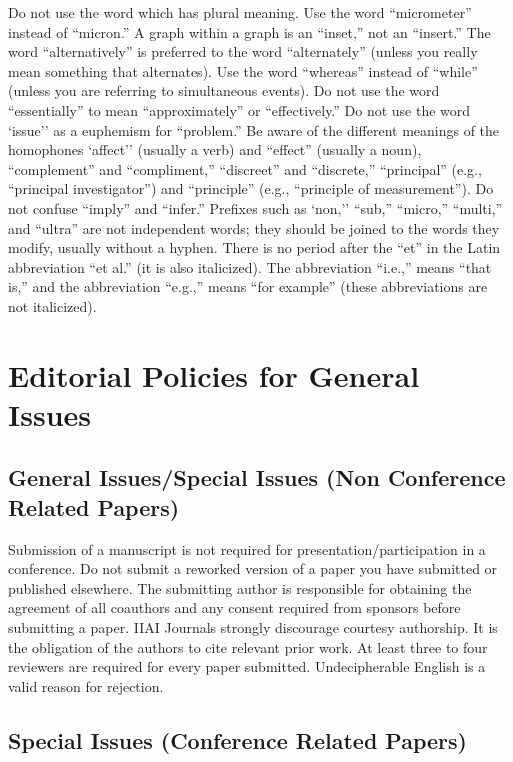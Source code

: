 \documentclass[11pt, onecolumn, twoside, a4paper]{article}
\begin{document}
Do not use the word which has plural meaning. 
Use the word ``micrometer'' instead of ``micron.'' 
A graph within a graph is an ``inset,'' not an ``insert.'' 
The word ``alternatively'' is preferred to the word ``alternately'' (unless you really mean something that alternates). 
Use the word ``whereas'' instead of ``while'' (unless you are referring to simultaneous events). 
Do not use the word ``essentially'' to mean ``approximately'' or ``effectively.'' 
Do not use the word `issue'' as a euphemism for ``problem.'' 
Be aware of the different meanings of the homophones `affect'' (usually a verb) and ``effect'' (usually a noun), ``complement'' and ``compliment,'' ``discreet'' and ``discrete,'' ``principal'' (e.g., ``principal investigator'') and ``principle'' (e.g., ``principle of measurement''). Do not confuse ``imply'' and ``infer.'' 
Prefixes such as `non,'' ``sub,'' ``micro,'' ``multi,'' and ``ultra'' are not independent words; they should be joined to the words they modify, usually without a hyphen. 
There is no period after the ``et'' in the Latin abbreviation ``et al.'' (it is also italicized). 
The abbreviation ``i.e.,'' means ``that is,'' and the abbreviation ``e.g.,'' means ``for example'' (these abbreviations are not italicized). 



\section{Editorial Policies for General Issues}

\subsection{General Issues/Special Issues (Non Conference Related Papers)}

Submission of a manuscript is not required for presentation/participation in a conference. 
Do not submit a reworked version of a paper you have submitted or published elsewhere. 
The submitting author is responsible for obtaining the agreement of all coauthors and any consent required from sponsors before submitting a paper. IIAI Journals strongly discourage courtesy authorship. 
It is the obligation of the authors to cite relevant prior work. 
At least three to four reviewers are required for every paper submitted. 
Undecipherable English is a valid reason for rejection. 


\subsection{Special Issues (Conference Related Papers)}
\end{document}
